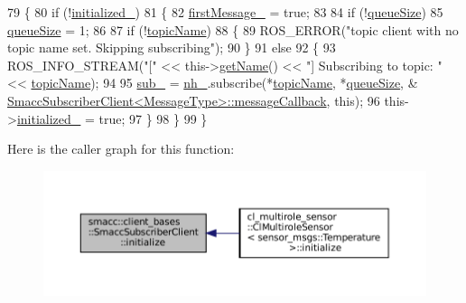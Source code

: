 \begin{DoxyCode}
79   \{
80     \textcolor{keywordflow}{if} (!\hyperlink{classsmacc_1_1client__bases_1_1SmaccSubscriberClient_a2096c76f6464d0a513625cc53dba51ed}{initialized\_})
81     \{
82       \hyperlink{classsmacc_1_1client__bases_1_1SmaccSubscriberClient_a1283e89a0d33a9028a5042519c6869a6}{firstMessage\_} = \textcolor{keyword}{true};
83 
84       \textcolor{keywordflow}{if} (!\hyperlink{classsmacc_1_1client__bases_1_1SmaccSubscriberClient_a67f03f081d83476cdb7fd631b6aba450}{queueSize})
85         \hyperlink{classsmacc_1_1client__bases_1_1SmaccSubscriberClient_a67f03f081d83476cdb7fd631b6aba450}{queueSize} = 1;
86 
87       \textcolor{keywordflow}{if} (!\hyperlink{classsmacc_1_1client__bases_1_1SmaccSubscriberClient_aeadf21a09412c6c9488e5acd50fb4f40}{topicName})
88       \{
89         ROS\_ERROR(\textcolor{stringliteral}{"topic client with no topic name set. Skipping subscribing"});
90       \}
91       \textcolor{keywordflow}{else}
92       \{
93         ROS\_INFO\_STREAM(\textcolor{stringliteral}{"["} << this->\hyperlink{classsmacc_1_1ISmaccClient_a8c3ce19f182e71909c5dc6263d25be69}{getName}() << \textcolor{stringliteral}{"] Subscribing to topic: "} << 
      \hyperlink{classsmacc_1_1client__bases_1_1SmaccSubscriberClient_aeadf21a09412c6c9488e5acd50fb4f40}{topicName});
94 
95         \hyperlink{classsmacc_1_1client__bases_1_1SmaccSubscriberClient_a0f69a1b0a284ae47f5d717c6ab95f089}{sub\_} = \hyperlink{classsmacc_1_1client__bases_1_1SmaccSubscriberClient_a401d2476e89e27acc2e905acd701f053}{nh\_}.subscribe(*\hyperlink{classsmacc_1_1client__bases_1_1SmaccSubscriberClient_aeadf21a09412c6c9488e5acd50fb4f40}{topicName}, *\hyperlink{classsmacc_1_1client__bases_1_1SmaccSubscriberClient_a67f03f081d83476cdb7fd631b6aba450}{queueSize}, &
      \hyperlink{classsmacc_1_1client__bases_1_1SmaccSubscriberClient_acf85b80439aff5cf2bfa0649e9e45654}{SmaccSubscriberClient<MessageType>::messageCallback}, \textcolor{keyword}{
      this});
96         this->\hyperlink{classsmacc_1_1client__bases_1_1SmaccSubscriberClient_a2096c76f6464d0a513625cc53dba51ed}{initialized\_} = \textcolor{keyword}{true};
97       \}
98     \}
99   \}
\end{DoxyCode}
Here is the caller graph for this function\+:
\nopagebreak
\begin{figure}[H]
\begin{center}
\leavevmode
\includegraphics[width=350pt]{classsmacc_1_1client__bases_1_1SmaccSubscriberClient_af188f0f5e89de26a07e1f964cdd23a70_icgraph}
\end{center}
\end{figure}
